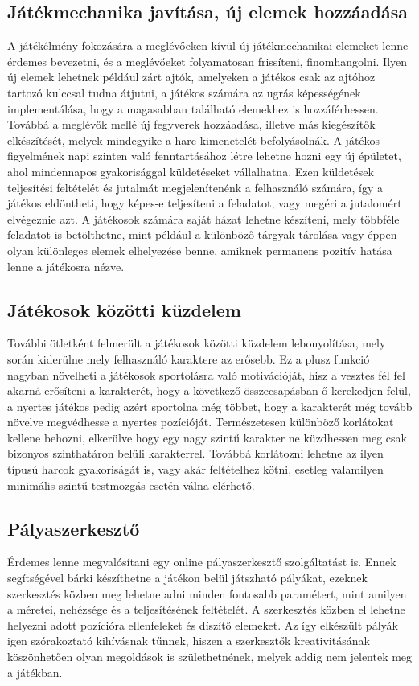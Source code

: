 \subsection*{Játékmechanika javítása, új elemek hozzáadása}
\label{jatekmechanika}
A játékélmény fokozására a meglévőeken kívül új játékmechanikai elemeket lenne érdemes bevezetni, és a meglévőeket folyamatosan frissíteni, finomhangolni. 
Ilyen új elemek lehetnek például zárt ajtók, amelyeken a játékos csak az ajtóhoz tartozó kulccsal tudna átjutni, a játékos számára az ugrás képességének implementálása, hogy a magasabban található elemekhez is hozzáférhessen. 
Továbbá a meglévők mellé új fegyverek hozzáadása, illetve más kiegészítők elkészítését, melyek mindegyike a harc kimenetelét befolyásolnák. 
A játékos figyelmének napi szinten való fenntartásához létre lehetne hozni egy új épületet, ahol mindennapos gyakorisággal küldetéseket vállalhatna. 
Ezen küldetések teljesítési feltételét és jutalmát megjelenítenénk a felhasználó számára, így a játékos eldöntheti, hogy képes-e teljesíteni a feladatot, vagy megéri a jutalomért elvégeznie azt. 
A játékosok számára saját házat lehetne készíteni, mely többféle feladatot is betölthetne, mint például a különböző tárgyak tárolása vagy éppen olyan különleges elemek elhelyezése benne, amiknek permanens pozitív hatása lenne a játékosra nézve. 

\subsection*{Játékosok közötti küzdelem}
\label{pvp}
További ötletként felmerült a játékosok közötti küzdelem lebonyolítása, mely során kiderülne mely felhasználó karaktere az erősebb. 
Ez a plusz funkció nagyban növelheti a játékosok sportolásra való motivációját, hisz a vesztes fél fel akarná erősíteni a karakterét, hogy a következő összecsapásban ő kerekedjen felül, a nyertes játékos pedig azért sportolna még többet, hogy a karakterét még tovább növelve megvédhesse a nyertes pozícióját. 
Természetesen különböző korlátokat kellene behozni, elkerülve hogy egy nagy szintű karakter ne küzdhessen meg csak bizonyos szinthatáron belüli karakterrel. 
Továbbá korlátozni lehetne az ilyen típusú harcok gyakoriságát is, vagy akár feltételhez kötni, esetleg valamilyen minimális szintű testmozgás esetén válna elérhető. 

\subsection*{Pályaszerkesztő}
\label{palyaszerkeszto}
Érdemes lenne megvalósítani egy online pályaszerkesztő szolgáltatást is. 
Ennek segítségével bárki készíthetne a játékon belül játszható pályákat, ezeknek szerkesztés közben meg lehetne adni minden fontosabb paramétert, mint amilyen a méretei, nehézsége és a teljesítésének feltételét. 
A szerkesztés közben el lehetne helyezni adott pozícióra ellenfeleket és díszítő elemeket. 
Az így elkészült pályák igen szórakoztató kihívásnak tűnnek, hiszen a szerkesztők kreativitásának köszönhetően olyan megoldások is születhetnének, melyek addig nem jelentek meg a játékban. 

